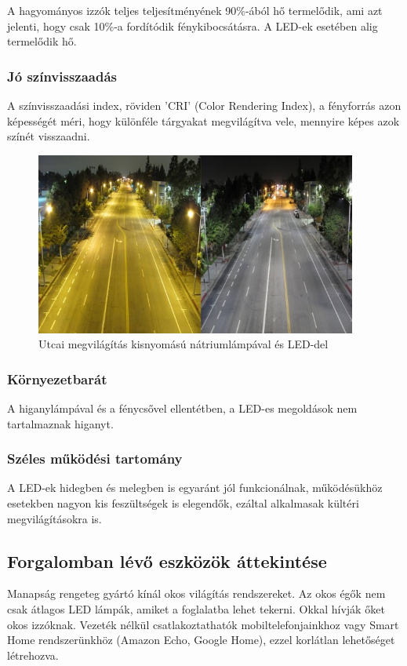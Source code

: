 \documentclass[../main.tex]{subfiles}
\begin{document}
            A hagyományos izzók teljes teljesítményének 90\%-ából hő termelődik, ami azt jelenti, hogy csak 10\%-a fordítódik fénykibocsátásra. A LED-ek esetében alig termelődik hő. \citep{led_lighting}
        \subsubsection{Jó színvisszaadás}
            A színvisszaadási index, röviden 'CRI' (Color Rendering Index), a fényforrás azon képességét méri, hogy különféle tárgyakat megvilágítva vele, mennyire képes azok színét visszaadni. \citep{led_lighting2}
             \begin{figure}[h!]
                \centering
                \includegraphics[height=6cm]{irodalom_res/cri_los_angeles.jpg}
                \caption{Utcai megvilágítás kisnyomású nátriumlámpával és LED-del \cite{led_lighting3}}
             \end{figure}

             
        \subsubsection{Környezetbarát}
            A higanylámpával és a fénycsővel ellentétben, a LED-es megoldások nem tartalmaznak higanyt.
        \subsubsection{Széles működési tartomány}
            A LED-ek hidegben és melegben is egyaránt jól funkcionálnak, működésükhöz esetekben nagyon kis feszültségek is elegendők, ezáltal alkalmasak kültéri megvilágításokra is.
    
    \subsection{Forgalomban lévő eszközök áttekintése}
        Manapság rengeteg gyártó kínál okos világítás rendszereket. %
        Az okos égők nem csak átlagos LED lámpák, amiket a foglalatba lehet tekerni. Okkal hívják őket okos izzóknak. Vezeték nélkül csatlakoztathatók mobiltelefonjainkhoz vagy Smart Home rendszerünkhöz (Amazon Echo, Google Home), ezzel korlátlan lehetőséget létrehozva. 
        
\end{document}
